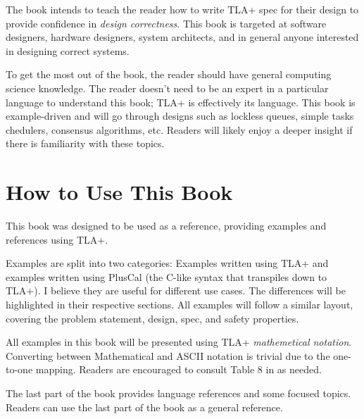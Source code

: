 The book intends to teach the reader how to write TLA+ spec for their design to
provide confidence in \textit{design correctness}. This book is targeted at
software designers, hardware designers, system architects, and in general anyone
interested in designing correct systems.\newline 

To get the most out of the book, the reader should have general computing
science knowledge. The reader doesn't need to be an expert in a particular
language to understand this book; TLA+ is effectively its language. This book is
example-driven and will go through designs such as lockless queues, simple
tasks chedulers, consensus algorithms, etc. Readers will likely enjoy a deeper
insight if there is familiarity with these topics.

\section{How to Use This Book}

This book was designed to be used as a reference, providing examples
and references using TLA+.\newline

Examples are split into two categories: Examples written using TLA+ and
examples written using PlusCal (the C-like syntax that transpiles down to TLA+).
I believe they are useful for different use cases. The differences will
be highlighted in their respective sections. All examples will follow a
similar layout, covering the problem statement, design, spec, and safety
properties.\newline

All examples in this book will be presented using TLA+
\textit{mathemetical notation}. Converting between Mathematical and ASCII
notation is trivial due to the one-to-one mapping. Readers are encouraged to
consult Table 8 in \cite{ss} as needed.\newline

The last part of the book provides language references and some focused topics.
Readers can use the last part of the book as a general reference. 
